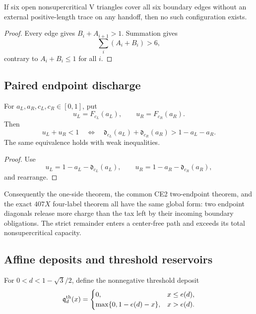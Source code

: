 \begin{corollary}
\label{cor:appendix-rank-zero-discharge}
If six open nonsupercritical V triangles cover all six boundary edges without
an external positive-length trace on any handoff, then no such configuration
exists.
\end{corollary}

\begin{proof}
Every edge gives \(B_i+A_{i+1}>1\).  Summation gives
\[
 \sum_i(A_i+B_i)>6,
\]
contrary to \(A_i+B_i\le1\) for all \(i\).
\end{proof}

\subsection{Paired endpoint discharge}

\begin{lemma}
\label{lem:appendix-endpoint-release}
For \(a_L,a_R,c_L,c_R\in[0,1]\), put
\[
 u_L=F_{c_L}(a_L),
 \qquad
 u_R=F_{c_R}(a_R).
\]
Then
\begin{equation}
 u_L+u_R<1
 \quad\Longleftrightarrow\quad
 \mathfrak d_{c_L}(a_L)+\mathfrak d_{c_R}(a_R)
 >1-a_L-a_R.
 \label{eq:appendix-endpoint-release}
\end{equation}
The same equivalence holds with weak inequalities.
\end{lemma}

\begin{proof}
Use
\[
 u_L=1-a_L-\mathfrak d_{c_L}(a_L),
 \qquad
 u_R=1-a_R-\mathfrak d_{c_R}(a_R),
\]
and rearrange.
\end{proof}

Consequently the one-side theorem, the common CE2 two-endpoint theorem, and
the exact \(407X\) four-label theorem all have the same global form: two
endpoint diagonals release more charge than the tax left by their incoming
boundary obligations.  The strict remainder enters a center-free path and
exceeds its total nonsupercritical capacity.

\subsection{Affine deposits and threshold reservoirs}

For \(0<d<1-\sqrt3/2\), define the nonnegative threshold deposit
\begin{equation}
 \mathfrak q_d^{\rm th}(x)=
 \begin{cases}
 0,&x\le e(d),\\
 \max\{0,1-e(d)-x\},&x>e(d).
 \end{cases}
 \label{eq:appendix-threshold-deposit}
\end{equation}

